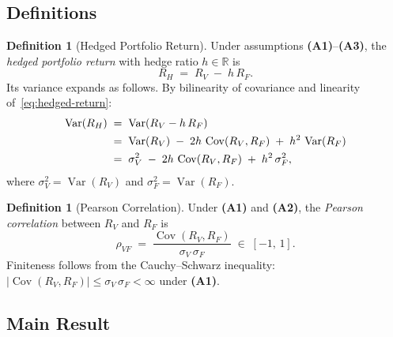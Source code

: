 \documentclass[12pt,openany]{book}
\newcommand{\R}{\mathbb{R}}
\numberwithin{equation}{chapter}
\theoremstyle{plain}
\theoremstyle{definition}
\newtheorem{definition}[theorem]{Definition}
\theoremstyle{remark}
\numberwithin{equation}{chapter}
\theoremstyle{plain}
\DeclareMathOperator{\Var}{Var}
\DeclareMathOperator{\Cov}{Cov}
\begin{document}
\subsection{Definitions}
\label{ssec:hedge-defs}

\begin{definition}[Hedged Portfolio Return]
\label{def:hedged-return}
Under assumptions \textbf{(A1)}--\textbf{(A3)}, the
\emph{hedged portfolio return} with hedge ratio $h \in \R$ is
\begin{equation}
  R_H \;=\; R_V \;-\; h\,R_F.
  \label{eq:hedged-return}
\end{equation}
Its variance expands as follows.
By bilinearity of covariance and linearity of~\eqref{eq:hedged-return}:
\begin{align}
  \Var(R_H)
    &\;=\; \Var(R_V - h\,R_F)
           \notag\\
    &\;=\; \Var(R_V)
           \;-\; 2h\,\Cov(R_V, R_F)
           \;+\; h^2\,\Var(R_F)
           \notag\\
    &\;=\; \sigma_V^2
           \;-\; 2h\,\Cov(R_V, R_F)
           \;+\; h^2\,\sigma_F^2,
  \label{eq:hedged-var}
\end{align}
where $\sigma_V^2 = \Var(R_V)$ and $\sigma_F^2 = \Var(R_F)$.
\end{definition}

\begin{definition}[Pearson Correlation]
\label{def:pearson}
Under \textbf{(A1)} and \textbf{(A2)}, the \emph{Pearson correlation}
between $R_V$ and $R_F$ is
\begin{equation}
  \rho_{VF}
    \;=\; \frac{\Cov(R_V, R_F)}{\sigma_V\,\sigma_F}
    \;\in\; [-1,\,1].
  \label{eq:pearson}
\end{equation}
Finiteness follows from the Cauchy--Schwarz inequality:
$|\Cov(R_V,R_F)| \leq \sigma_V\,\sigma_F < \infty$
under \textbf{(A1)}.
\end{definition}

\subsection{Main Result}
\label{ssec:hedge-main}
\end{document}
